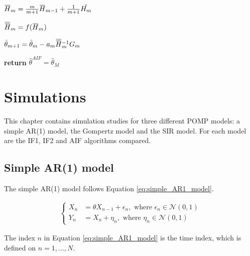 \documentclass[twoside,openright]{report}
\newcommand{\overbar}[1]{\mkern 1.5mu\overline{\mkern-1.5mu#1\mkern-1.5mu}\mkern 1.5mu}
\begin{document}
\begin{algorithm}[]
\begin{algorithmic}
        \State $\overbar{H}_m = \frac{m}{m+1} \overbar{H}_{m-1} + \frac{1}{m+1} \hat{H_m}$
        
        \State $\overbar{\overbar{H}}_{m} =  f(\overbar{H}_m)$

        \State $\hat{\theta}_{m+1} = \hat{\theta}_m - a_m \overbar{\overbar{H}}_{m}^{-1} G_m$
    
    \EndFor

\State \textbf{return} $\hat{\theta}^{AIF} = \hat{\theta}_M$

\end{algorithmic}
\end{algorithm}


\chapter{Simulations} \label{chap:simulations}
This chapter contains simulation studies for three different POMP models: a simple AR(1) model, the Gompertz model and the SIR model. For each model are the IF1, IF2 and AIF algorithms compared. 



\section{Simple AR(1) model}

The simple AR(1) model follows Equation \ref{eq:simple_AR1_model}. 

\begin{align} \label{eq:simple_AR1_model}
\begin{cases}
    X_n &= \theta X_{n-1} + \epsilon_n , \,\, \text{where} \,\, \epsilon_n \in \mathcal{N}(0,1) \\
    Y_n &= X_n + \eta_n , \,\, \text{where} \,\,  \eta_n \in \mathcal{N}(0,1)
\end{cases}
\end{align}

The  index $n$ in Equation \ref{eq:simple_AR1_model} is the time index, which is defined on $n = 1, \ldots ,N$.
\end{document}
